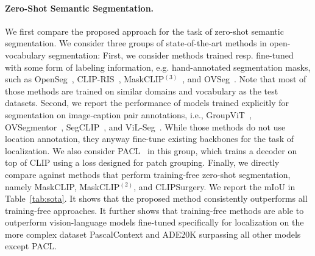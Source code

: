 \documentclass[10pt,twocolumn,letterpaper]{article}
\begin{document}
\paragraph{Zero-Shot Semantic Segmentation.}
We first compare the proposed approach for the task of zero-shot semantic segmentation. We consider three groups of state-of-the-art methods in open-vocabulary segmentation: First, we consider methods trained resp. fine-tuned with some form of labeling information, e.g. hand-annotated segmentation masks, such as OpenSeg~\citep{ghiasi2022scaling}, CLIP-RIS~\citep{yu2023zero}, MaskCLIP$^{(3)}$~\citep{ding2022open}, and OVSeg~\citep{liang2023open}. Note that most of those methods are trained on similar domains and vocabulary as the test datasets. Second, we report the performance of models trained explicitly for segmentation on image-caption pair annotations, i.e., GroupViT~\citep{xu2022groupvit}, OVSegmentor~\citep{xu2023learning}, SegCLIP~\citep{luo2023segclip}, and ViL-Seg~\citep{liu2022open}. While those methods do not use location annotation, they anyway fine-tune existing backbones for the task of localization.
We also consider PACL~\citep{mukhoti2023open} in this group, which trains a decoder on top of CLIP using a loss designed for patch grouping.
Finally, we directly compare against methods that perform training-free zero-shot segmentation, namely MaskCLIP, MaskCLIP$^{(2)}$, and CLIPSurgery.
We report the mIoU in Table~\ref{tab:sota}. 
It shows that the proposed method consistently outperforms all training-free approaches. 
It further shows that training-free methods are able to outperform vision-language models fine-tuned specifically for localization on the more complex dataset PascalContext and ADE20K surpassing all other models except PACL. 

\vspace{-5mm}
\end{document}
